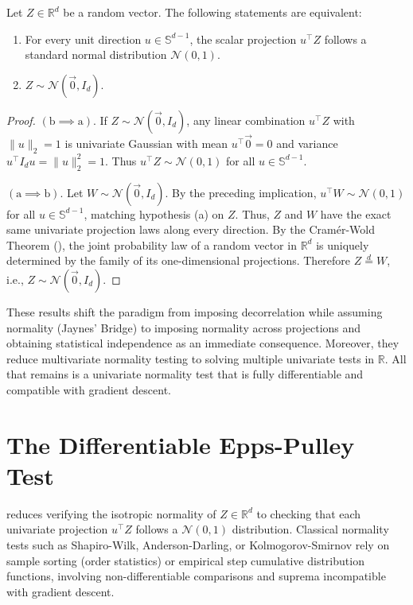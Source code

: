 \documentclass[11pt, oneside, openany]{book}
\begin{document}
\begin{proposition}
\label{prop:7.2}
Let $Z \in \mathbb{R}^{d}$ be a random vector. The following statements are equivalent:
\begin{enumerate}[label=(\alph*)]
    \item For every unit direction $u \in \mathbb{S}^{d-1}$, the scalar projection $u^{\top} Z$ follows a standard normal distribution $\mathcal{N}(0, 1)$.
    \item $Z \sim \mathcal{N}(\vec{0}, I_{d})$.
\end{enumerate}
\end{proposition}

\begin{proof}
$(\text{b} \implies \text{a})$. If $Z \sim \mathcal{N}(\vec{0}, I_{d})$, any linear combination $u^{\top} Z$ with $\lVert u \rVert_{2} = 1$ is univariate Gaussian with mean $u^{\top} \vec{0} = 0$ and variance $u^{\top} I_{d} u = \lVert u \rVert_{2}^{2} = 1$. Thus $u^{\top} Z \sim \mathcal{N}(0, 1)$ for all $u \in \mathbb{S}^{d-1}$.

$(\text{a} \implies \text{b})$. Let $W \sim \mathcal{N}(\vec{0}, I_{d})$. By the preceding implication, $u^{\top} W \sim \mathcal{N}(0, 1)$ for all $u \in \mathbb{S}^{d-1}$, matching hypothesis (a) on $Z$. Thus, $Z$ and $W$ have the exact same univariate projection laws along every direction. By the Cram\'er-Wold Theorem (), the joint probability law of a random vector in $\mathbb{R}^{d}$ is uniquely determined by the family of its one-dimensional projections. Therefore $Z \stackrel{d}{=} W$, i.e., $Z \sim \mathcal{N}(\vec{0}, I_{d})$.
\end{proof}

These results shift the paradigm from imposing decorrelation while assuming normality (Jaynes' Bridge) to imposing normality across projections and obtaining statistical independence as an immediate consequence. Moreover, they reduce multivariate normality testing to solving multiple univariate tests in $\mathbb{R}$. All that remains is a univariate normality test that is fully differentiable and compatible with gradient descent.

\section{The Differentiable Epps-Pulley Test}
\label{sec:7.2}

 reduces verifying the isotropic normality of $Z \in \mathbb{R}^{d}$ to checking that each univariate projection $u^{\top} Z$ follows a $\mathcal{N}(0, 1)$ distribution. Classical normality tests such as Shapiro-Wilk, Anderson-Darling, or Kolmogorov-Smirnov rely on sample sorting (order statistics) or empirical step cumulative distribution functions, involving non-differentiable comparisons and suprema incompatible with gradient descent.
\end{document}
